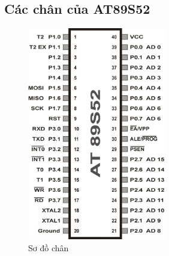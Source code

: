 \documentclass[../report.tex]{subfiles}
\begin{document}
\subsection{Các chân của AT89S52}
\begin{figure}[H]
\centering
\includegraphics[width=6cm]{figures/at89s52_pins.jpg}
\caption{Sơ đồ chân}
\end{figure}
\end{document}
